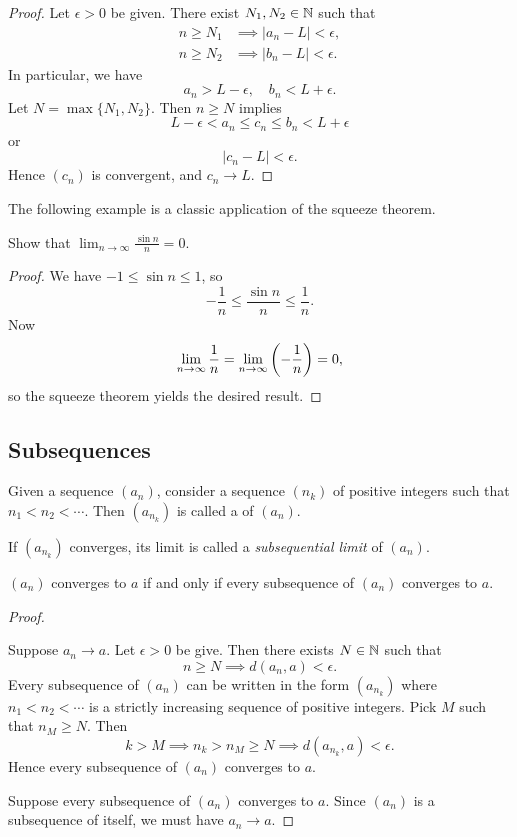 \begin{proof}
Let $\epsilon>0$ be given. There exist $N_1,N_2\in\mathbb N$ such that
\begin{align*}
n\ge N_1&\implies|a_n-L|<\epsilon,\\
n\ge N_2&\implies|b_n-L|<\epsilon.
\end{align*}
In particular, we have
\[a_n>L-\epsilon,\quad b_n<L+\epsilon.\]
Let $N=\max\{N_1,N_2\}$. Then $n\ge N$ implies
\[L-\epsilon<a_n\le c_n\le b_n<L+\epsilon\]
or
\[|c_n-L|<\epsilon.\]
Hence $(c_n)$ is convergent, and $c_n\to L$.
\end{proof}

The following example is a classic application of the squeeze theorem.

\begin{example}
Show that $\displaystyle\lim_{n\to\infty}\frac{\sin n}{n}=0$.
\begin{proof}
We have $-1\le \sin n\le 1$, so
\[-\frac{1}{n}\le\frac{\sin n}{n}\le\frac{1}{n}.\]
Now
\[\lim_{n\to\infty}\frac{1}{n}=\lim_{n\to\infty}\left(-\frac{1}{n}\right)=0,\]
so the squeeze theorem yields the desired result.
\end{proof}
\end{example}
\pagebreak

\subsection{Subsequences}
\begin{definition}[Subsequence]
Given a sequence $(a_n)$, consider a sequence $(n_k)$ of positive integers such that $n_1<n_2<\cdots$. Then $(a_{n_k})$ is called a  of $(a_n)$.

If $(a_{n_k})$ converges, its limit is called a \emph{subsequential limit} of $(a_n)$.
\end{definition}

\begin{proposition}
$(a_n)$ converges to $a$ if and only if every subsequence of $(a_n)$ converges to $a$.
\end{proposition}

\begin{proof} \

\fbox{$\implies$} Suppose $a_n\to a$. Let $\epsilon>0$ be give. Then there exists $N\in\mathbb N$ such that
\[n\ge N\implies d(a_n,a)<\epsilon.\]
Every subsequence of $(a_n)$ can be written in the form $(a_{n_k})$ where $n_1<n_2<\cdots$ is a strictly increasing sequence of positive integers. Pick $M$ such that $n_M\ge N$. Then
\[k>M\implies n_k>n_M\ge N\implies d(a_{n_k},a)<\epsilon.\]
Hence every subsequence of $(a_n)$ converges to $a$.

\fbox{$\impliedby$} Suppose every subsequence of $(a_n)$ converges to $a$. Since $(a_n)$ is a subsequence of itself, we must have $a_n\to a$.
\end{proof}

